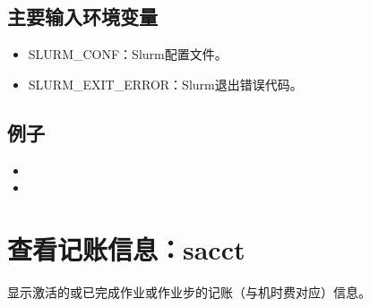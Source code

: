 \documentclass[a4paper,12pt,english]{sphinxmanual}
\begin{document}
\subsection{主要输入环境变量}
\label{\detokenize{slurm/slurm:id44}}\label{\detokenize{slurm/slurm:id45}}\begin{itemize}
\item {} 
\sphinxAtStartPar
SLURM\_CONF：Slurm配置文件。

\item {} 
\sphinxAtStartPar
SLURM\_EXIT\_ERROR：Slurm退出错误代码。

\end{itemize}


\subsection{例子}
\label{\detokenize{slurm/slurm:id46}}\label{\detokenize{slurm/slurm:id47}}\begin{itemize}
\item {} 
\sphinxAtStartPar
{}

\item {} 
\sphinxAtStartPar
{}

\end{itemize}


\section{查看记账信息：sacct}
\label{\detokenize{slurm/slurm:sacct}}
\sphinxAtStartPar
{}显示激活的或已完成作业或作业步的记账（与机时费对应）信息。
\end{document}
